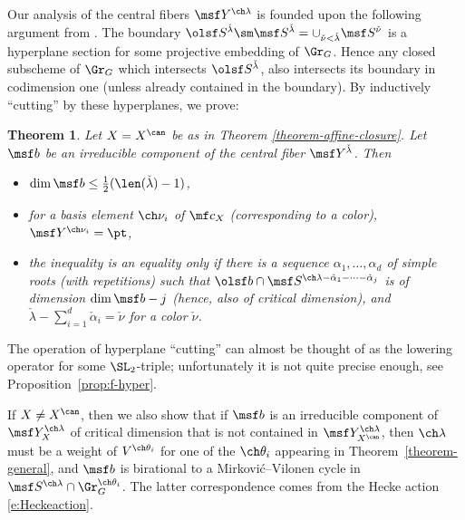 \documentclass[final]{amsart}
\newtheorem{thm}[subsubsection]{Theorem}
\theoremstyle{remark}
\theoremstyle{definition}
\numberwithin{equation}{section}
\begin{document}
\smallskip

Our analysis of the central fibers $\msf Y^{\ch\lambda}$ is founded upon the following argument from
\cite[\S 3]{MV}. 
The boundary $\olsf S^{\check\lambda}\sm \msf S^{\check\lambda} = \cup_{\check\nu<\check\lambda} \msf S^{\check\nu}$ is a hyperplane section for some projective embedding of $\Gr_G$.
Hence any closed subscheme of $\Gr_G$ which intersects $\olsf S^{\check\lambda}$, also intersects its boundary in codimension one (unless already contained in the boundary). By inductively ``cutting'' by these hyperplanes,
we prove:

\begin{thm}
\label{theorem-slicing}
Let $X = X^\can$ be as in Theorem \ref{theorem-affine-closure}. 
 Let $\msf b$ be an irreducible component of the central fiber $\msf Y^{\check\lambda}$. Then
 \begin{itemize}
  \item $\dim \msf b \le \frac{1}{2} (\len(\check\lambda)-1)$, 
  \item for a basis element $\ch\nu_i$ of $\mf c_X$ (corresponding to a color), $\msf Y^{\ch\nu_i} = \pt$,
  \item the inequality is an equality only if there is a sequence $\alpha_1,\dots,\alpha_d$ of simple roots (with repetitions) such that $\olsf b \cap \msf S^{\ch\lambda-\check\alpha_1-\cdots-\check\alpha_j}$ is of dimension $\dim \msf b - j$ (hence, also of critical dimension), and $\check\lambda - \sum_{i=1}^d \check\alpha_i = \check\nu$ for a color $\check\nu$.
 \end{itemize}
\end{thm}

The operation of hyperplane ``cutting'' can almost be thought of as the lowering operator 
for some $\SL_2$-triple; unfortunately it is not quite precise enough, see Proposition~\ref{prop:f-hyper}. 

\medskip

If $X \ne X^\can$, then we also show that if $\msf b$ is an irreducible component of 
$\msf Y^{\ch\lambda}_X$ of critical dimension that is not contained in $\msf Y^{\ch\lambda}_{X^\can}$, then
$\ch\lambda$ must be a weight of $V^{\ch\theta_i}$ for one of the $\ch\theta_i$ appearing in 
Theorem~\ref{theorem-general}, and $\msf b$ is birational to a Mirkovi\'c--Vilonen cycle in 
$\msf S^{\ch\lambda} \cap \Gr_G^{\ch\theta_i}$. The latter correspondence comes from the Hecke action \eqref{e:Heckeaction}.

\medskip
\end{document}
